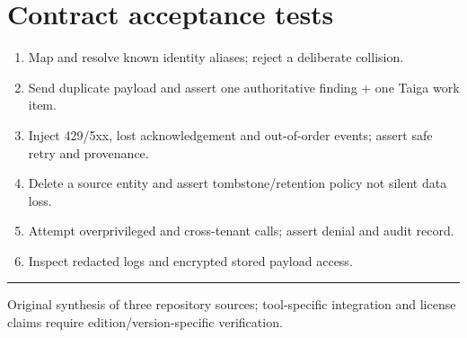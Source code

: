 \documentclass[10pt,letterpaper]{article}
\begin{document}
\section{Contract acceptance tests}
\begin{enumerate}
\item Map and resolve known identity aliases; reject a deliberate collision.
\item Send duplicate payload and assert one authoritative finding + one Taiga work item.
\item Inject 429/5xx, lost acknowledgement and out-of-order events; assert safe retry and provenance.
\item Delete a source entity and assert tombstone/retention policy not silent data loss.
\item Attempt overprivileged and cross-tenant calls; assert denial and audit record.
\item Inspect redacted logs and encrypted stored payload access.
\end{enumerate}
\vfill\noindent\color{muted}\rule{\linewidth}{0.4pt}\par\scriptsize Original synthesis of three repository sources; tool-specific integration and license claims require edition/version-specific verification.\normalsize
\end{document}

